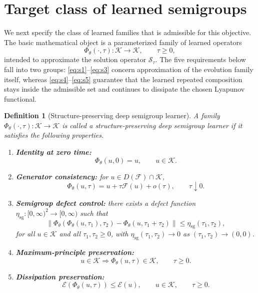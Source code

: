 \documentclass[11pt]{article}
\newtheorem{definition}{Definition}
\newcommand{\cS}{\mathcal{S}}
\newcommand{\cK}{\mathcal{K}}
\newcommand{\cE}{\mathcal{E}}
\newcommand{\cF}{\mathcal{F}}
\newcommand{\PhiT}{\Phi_{\theta}}
\newcommand{\norm}[1]{\left\lVert #1 \right\rVert}
\begin{document}
\section{Target class of learned semigroups}
We next specify the class of learned families that is admissible for this objective. The basic mathematical object is a parameterized family of learned operators
\begin{equation}\label{eq:learned-family}
\PhiT(\cdot,\tau) : \cK \to \cK, \qquad \tau\ge 0,
\end{equation}
intended to approximate the solution operator \(\cS_{\tau}\). The five requirements below fall into two groups: \eqref{eq:s1}--\eqref{eq:s3} concern approximation of the evolution family itself, whereas \eqref{eq:s4}--\eqref{eq:s5} guarantee that the learned repeated composition stays inside the admissible set and continues to dissipate the chosen Lyapunov functional.

\begin{definition}[Structure-preserving deep semigroup learner]\label{def:main-learner}
A family \(\PhiT(\cdot,\tau):\cK\to \cK\) is called a structure-preserving deep semigroup learner if it satisfies the following properties.
\begin{enumerate}[label=(S\arabic*)]
    \item \textbf{Identity at zero time:}
    \begin{equation}\label{eq:s1}
    \PhiT(u,0)=u, \qquad u\in \cK.
    \end{equation}

    \item \textbf{Generator consistency:}
    for \(u\in D(\cF)\cap \cK\),
    \begin{equation}\label{eq:s2}
    \PhiT(u,\tau)=u+\tau\cF(u)+o(\tau), \qquad \tau\downarrow 0.
    \end{equation}

    \item \textbf{Semigroup defect control:}
    there exists a defect function \(\eta_{\mathrm{sg}}:[0,\infty)^2\to [0,\infty)\) such that
    \begin{equation}\label{eq:s3}
    \norm{\PhiT(\PhiT(u,\tau_1),\tau_2)-\PhiT(u,\tau_1+\tau_2)} \le \eta_{\mathrm{sg}}(\tau_1,\tau_2),
    \end{equation}
    for all \(u\in \cK\) and all \(\tau_1,\tau_2\ge 0\), with \(\eta_{\mathrm{sg}}(\tau_1,\tau_2)\to 0\) as \((\tau_1,\tau_2)\to (0,0)\).

    \item \textbf{Maximum-principle preservation:}
    \begin{equation}\label{eq:s4}
    u\in \cK \Longrightarrow \PhiT(u,\tau)\in \cK, \qquad \tau\ge 0.
    \end{equation}

    \item \textbf{Dissipation preservation:}
    \begin{equation}\label{eq:s5}
    \cE(\PhiT(u,\tau)) \le \cE(u), \qquad u\in \cK, \qquad \tau\ge 0.
    \end{equation}
\end{enumerate}
\end{definition}
\end{document}

